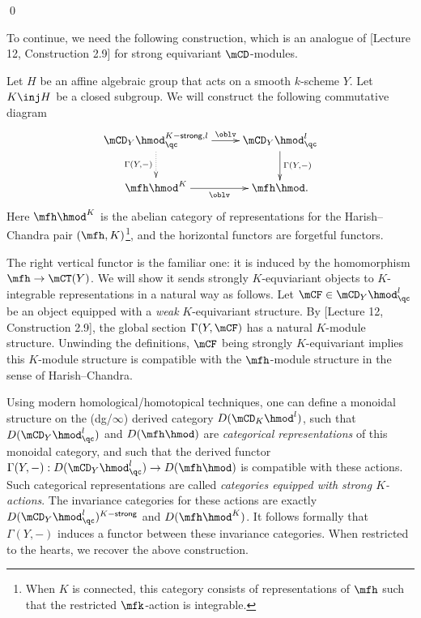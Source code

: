 	\qed

	To continue, we need the following construction, which is an analogue of [Lecture 12, Construction 2.9] for strong equivariant $\mCD$-modules.

	\begin{constr}
		\label{constr-strong-equiv-HC}

		Let $H$ be an affine algebraic group that acts on a smooth $k$-scheme $Y$. Let $K\inj H$ be a closed subgroup. We will construct the following commutative diagram
		\[
			\xymatrix{
				\mCD_Y\hmod_\qc^{K\mathsf{-strong},l} 
					\ar@{.>}[d]_-{\Gamma(Y,-)} \ar[r]^-\oblv
				& \mCD_Y\hmod_\qc^{l}  \ar[d]^-{\Gamma(Y,-)}
				\\
				\mfh\hmod^K \ar[r]_-\oblv
				& \mfh\hmod.
			}
		\]
		Here $\mfh\hmod^K$ is the abelian category of representations for the Harish--Chandra pair $(\mfh,K)$\footnote{When $K$ is connected, this category consists of representations of $\mfh$ such that the restricted $\mfk$-action is integrable.}, and the horizontal functors are forgetful functors.

		The right vertical functor is the familiar one: it is induced by the homomorphism $\mfh \to \mCT(Y)$. We will show it sends strongly $K$-equviariant objects to $K$-integrable representations in a natural way as follows. Let $\mCF\in \mCD_Y\hmod_\qc^{l} $ be an object equipped with a \emph{weak} $K$-equivariant structure. By [Lecture 12, Construction 2.9], the global section $\Gamma(Y,\mCF)$ has a natural $K$-module structure. Unwinding the definitions, $\mCF$ being strongly $K$-equivariant implies this $K$-module structure is compatible with the $\mfh$-module structure in the sense of Harish--Chandra.



	\end{constr}


	\begin{rem}
		\label{rem-strong-action}
		Using modern homological/homotopical techniques, one can define a monoidal structure on the (dg/$\infty$) derived category $D(\mCD_K\hmod^l)$, such that $D(\mCD_Y\hmod_\qc^l)$ and $D(\mfh\hmod)$ are \emph{categorical representations} of this monoidal category, and such that the derived functor $\Gamma(Y,-):D(\mCD_Y\hmod_\qc^l)\to D(\mfh\hmod)$ is compatible with these actions. Such categorical representations are called \emph{categories equipped with strong $K$-actions}. The invariance categories for these actions are exactly $D(\mCD_Y\hmod_\qc^l)^{K\mathsf{-strong}}$ and $D(\mfh\hmod^K)$. It follows formally that $\Gamma(Y,-)$ induces a functor between these invariance categories. When restricted to the hearts, we recover the above construction.

	\end{rem}


